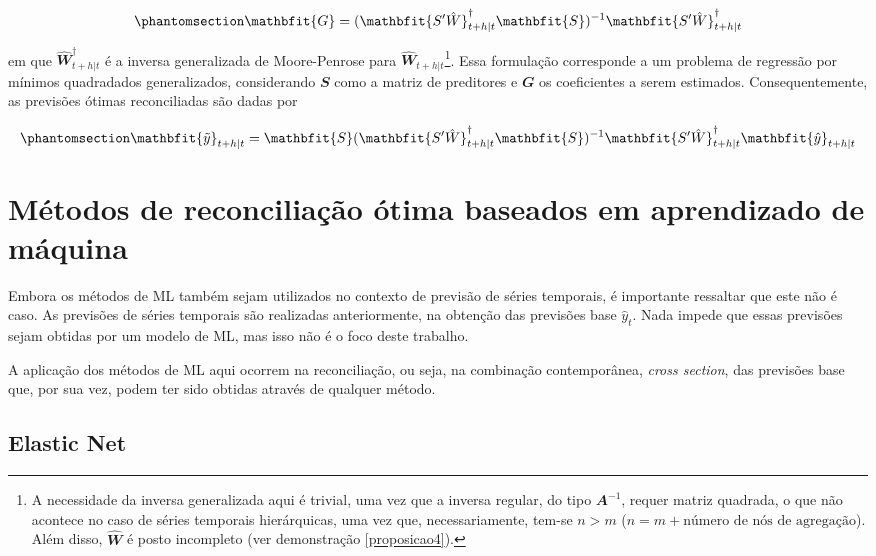 \documentclass[
  12pt,
  twoside,
  openright,
  a4paper,
  chapter=TITLE,
  section=TITLE,
  brazil]{abntex2}
\begin{document}
\begin{apendicesenv}
\begin{equation}\phantomsection\label{eq-mint3}{
\mathbfit{G} = (\mathbfit{S'\hat{W}}^\dagger_{t+h|t}\mathbfit{S})^{-1}\mathbfit{S'\hat{W}}^\dagger_{t+h|t}
}\end{equation}

\noindent em que \(\mathbfit{\hat{W}}^\dagger_{t+h|t}\) é a inversa
generalizada de Moore-Penrose para
\(\mathbfit{\hat{W}}_{t+h|t}\)\footnote{A necessidade da inversa
  generalizada aqui é trivial, uma vez que a inversa regular, do tipo
  \(\mathbfit{A}^{-1}\), requer matriz quadrada, o que não acontece no
  caso de séries temporais hierárquicas, uma vez que, necessariamente,
  tem-se \(n>m\) (\(n=m+\text{número de nós de agregação}\)). Além
  disso, \(\mathbfit{\hat{W}}\) é posto incompleto (ver demonstração
  \ref{proposicao4}).}. Essa formulação corresponde a um problema de
regressão por mínimos quadradados generalizados, considerando
\(\mathbfit{S}\) como a matriz de preditores e \(\mathbfit{G}\) os
coeficientes a serem estimados. Consequentemente, as previsões ótimas
reconciliadas são dadas por

\begin{equation}\phantomsection\label{eq-mint4}{
\mathbfit{\tilde{y}}_{t+h|t} = \mathbfit{S}(\mathbfit{S'\hat{W}}^\dagger_{t+h|t}\mathbfit{S})^{-1}\mathbfit{S'\hat{W}}^\dagger_{t+h|t}\mathbfit{\hat{y}}_{t+h|t}
}\end{equation}

\section{Métodos de reconciliação ótima baseados em aprendizado de
máquina}\label{muxe9todos-de-reconciliauxe7uxe3o-uxf3tima-baseados-em-aprendizado-de-muxe1quina}

Embora os métodos de ML também sejam utilizados no contexto de previsão
de séries temporais, é importante ressaltar que este não é caso. As
previsões de séries temporais são realizadas anteriormente, na obtenção
das previsões base \(\hat{y}_t\). Nada impede que essas previsões sejam
obtidas por um modelo de ML, mas isso não é o foco deste trabalho.

A aplicação dos métodos de ML aqui ocorrem na reconciliação, ou seja, na
combinação contemporânea, \emph{cross section}, das previsões base que,
por sua vez, podem ter sido obtidas através de qualquer método.

\subsection{Elastic Net}\label{elastic-net}


\end{apendicesenv}
\end{document}
